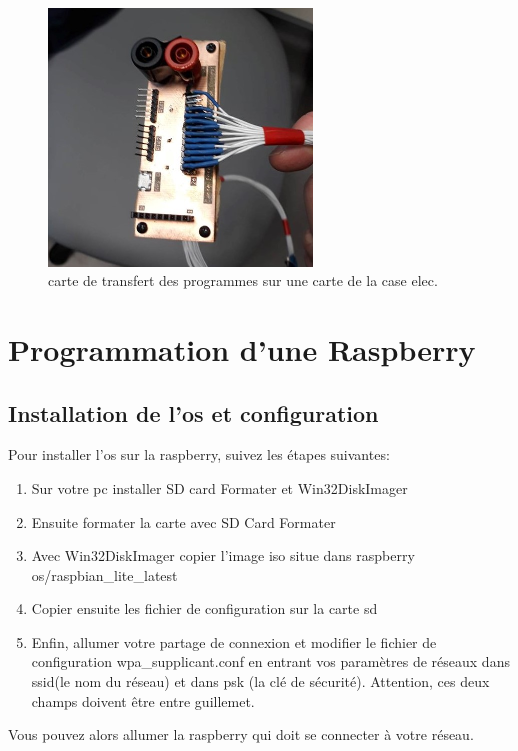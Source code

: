 \documentclass{article}
\begin{document}
\begin{figure}[H]
    \centering
    \includegraphics[width=7cm]{transfertCarteExpe}
	\caption{carte de transfert des programmes sur une carte de la case elec.}
	\label{carteTransfertExpe}
\end{figure}

\section{Programmation d'une Raspberry}
\subsection*{Installation de l'os et configuration}
Pour installer l'os sur la raspberry, suivez les étapes suivantes:
\begin{enumerate}
\item Sur votre pc installer SD card Formater et Win32DiskImager 
\item Ensuite formater la carte avec SD Card Formater 
\item Avec Win32DiskImager copier l'image iso situe dans raspberry os/raspbian\_lite\_latest
\item Copier ensuite les fichier de configuration sur la carte sd
\item Enfin, allumer votre partage de connexion et modifier le fichier de configuration wpa\_supplicant.conf en entrant vos paramètres de réseaux dans ssid(le nom du réseau) et dans psk (la clé de sécurité). Attention,
ces deux champs doivent être entre guillemet.
\end{enumerate}

Vous pouvez alors allumer la raspberry qui doit se connecter à votre réseau.
\end{document}
